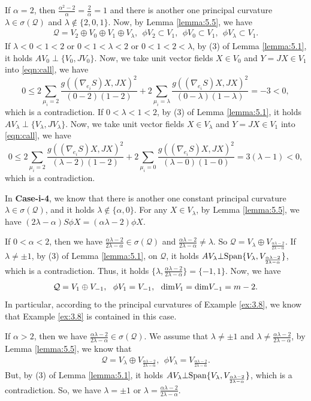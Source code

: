 \documentclass[reqno]{amsart}%
\theoremstyle{definition}
\numberwithin{equation}{section}
\begin{document}
If $\alpha=2$, then $\tfrac{\alpha^2-2}{\alpha}=\frac{2}{\alpha}=1$ and there is another one principal curvature $\lambda\in\sigma(\mathcal{Q})$ and
$\lambda\notin\{2,0,1\}$. Now, by Lemma \ref{lemma:5.5}, we have
$$
\begin{aligned}
\mathcal{Q}=V_2\oplus V_0\oplus V_1\oplus V_\lambda, \ \ \phi V_2\subset V_1,\ \ \phi V_0\subset V_1,\ \ \phi V_\lambda\subset V_1.
\end{aligned}
$$
If $\lambda<0<1<2$ or $0<1<\lambda<2$ or $0<1<2<\lambda$, by (3) of Lemma \ref{lemma:5.1}, it holds
$AV_0\perp \{V_0,JV_0\}$. Now, we take
unit vector fields $X\in V_0$ and $Y=JX\in V_1$ into \eqref{eqn:call}, we have
$$
0\leq2\sum_{\mu_i=2}\frac{g((\nabla_{e_i} S)X,JX)^2}{(0-2)(1-2)}+2\sum_{\mu_i=\lambda}\frac{g((\nabla_{e_i} S)X,JX)^2}{(0-\lambda)(1-\lambda)}
=-3<0,
$$
which is a contradiction.
If $0<\lambda<1<2$, by (3) of Lemma \ref{lemma:5.1}, it holds
$AV_\lambda\perp \{V_\lambda,JV_\lambda\}$. Now, we take unit vector fields $X\in V_\lambda$ and $Y=JX\in V_1$ into \eqref{eqn:call}, we have
$$
0\leq2\sum_{\mu_i=2}\frac{g((\nabla_{e_i} S)X,JX)^2}{(\lambda-2)(1-2)}+2\sum_{\mu_i=0}\frac{g((\nabla_{e_i} S)X,JX)^2}{(\lambda-0)(1-0)}
=3(\lambda-1)<0,
$$
which is a contradiction.




In {\bf Case-i-4}, we know that there is another one constant principal curvature
$\lambda\in\sigma(\mathcal{Q})$, and it holds
$\lambda\notin\{\alpha,0\}$. For any $X\in V_\lambda$, by Lemma \ref{lemma:5.5}, we have $(2\lambda-\alpha)S\phi X=(\alpha\lambda-2)\phi X$.

If $0<\alpha<2$, then we have $\frac{\alpha\lambda-2}{2\lambda-\alpha}\in\sigma(\mathcal{Q})$
and $\frac{\alpha\lambda-2}{2\lambda-\alpha}\neq\lambda$.
So $\mathcal{Q}=V_{\lambda}\oplus V_{\frac{\alpha\lambda-2}{2\lambda-\alpha}}$.
If $\lambda\neq\pm1$, by (3) of Lemma \ref{lemma:5.1}, on $\mathcal{Q}$, it holds
$AV_\lambda\bot {\rm Span}\{V_\lambda, V_{\frac{\alpha\lambda-2}{2\lambda-\alpha}}\}$, which is
a contradiction. Thus, it holds $\{\lambda,\frac{\alpha\lambda-2}{2\lambda-\alpha}\}=\{-1,1\}$.
Now, we have
$$
\begin{aligned}
\mathcal{Q}=V_1\oplus V_{-1}, \ \ \phi V_1= V_{-1},\ \ {\rm dim}V_1={\rm dim}V_{-1}=m-2.
\end{aligned}
$$
In particular, according to the principal curvatures of
Example \ref{ex:3.8}, we know that Example \ref{ex:3.8} is contained in this case.


If $\alpha>2$, then we have $\frac{\alpha\lambda-2}{2\lambda-\alpha}\in\sigma(\mathcal{Q})$.
We assume that $\lambda\neq\pm1$ and $\lambda\neq\frac{\alpha\lambda-2}{2\lambda-\alpha}$, by Lemma \ref{lemma:5.5}, we know that
$$
\begin{aligned}
\mathcal{Q}=V_\lambda\oplus V_{\frac{\alpha\lambda-2}{2\lambda-\alpha}}, \ \
\phi V_\lambda= V_{\frac{\alpha\lambda-2}{2\lambda-\alpha}}.
\end{aligned}
$$
But, by (3) of Lemma \ref{lemma:5.1}, it holds
$AV_\lambda\bot {\rm Span}\{V_\lambda, V_{\frac{\alpha\lambda-2}{2\lambda-\alpha}}\}$, which is
a contradiction. So, we have $\lambda=\pm1$ or $\lambda=\frac{\alpha\lambda-2}{2\lambda-\alpha}$.
\end{document}

